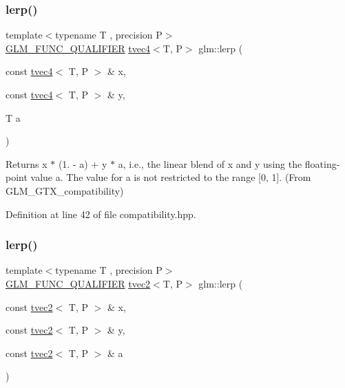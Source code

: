 \subsubsection{\texorpdfstring{lerp()}{lerp()}\hspace{0.1cm}{\footnotesize\ttfamily [4/7]}}
{\footnotesize\ttfamily template$<$typename T , precision P$>$ \\
\mbox{\hyperlink{setup_8hpp_a33fdea6f91c5f834105f7415e2a64407}{G\+L\+M\+\_\+\+F\+U\+N\+C\+\_\+\+Q\+U\+A\+L\+I\+F\+I\+ER}} \mbox{\hyperlink{structglm_1_1tvec4}{tvec4}}$<$T, P$>$ glm\+::lerp (\begin{DoxyParamCaption}\item[{const \mbox{\hyperlink{structglm_1_1tvec4}{tvec4}}$<$ T, P $>$ \&}]{x,  }\item[{const \mbox{\hyperlink{structglm_1_1tvec4}{tvec4}}$<$ T, P $>$ \&}]{y,  }\item[{T}]{a }\end{DoxyParamCaption})}



Returns x $\ast$ (1. -\/ a) + y $\ast$ a, i.\+e., the linear blend of x and y using the floating-\/point value a. The value for a is not restricted to the range \mbox{[}0, 1\mbox{]}. (From G\+L\+M\+\_\+\+G\+T\+X\+\_\+compatibility) 



Definition at line 42 of file compatibility.\+hpp.

\mbox{\label{group__gtx__compatibility_ga7609b44d8aefc5a277efe73395ff4070}} 
\subsubsection{\texorpdfstring{lerp()}{lerp()}\hspace{0.1cm}{\footnotesize\ttfamily [5/7]}}
{\footnotesize\ttfamily template$<$typename T , precision P$>$ \\
\mbox{\hyperlink{setup_8hpp_a33fdea6f91c5f834105f7415e2a64407}{G\+L\+M\+\_\+\+F\+U\+N\+C\+\_\+\+Q\+U\+A\+L\+I\+F\+I\+ER}} \mbox{\hyperlink{structglm_1_1tvec2}{tvec2}}$<$T, P$>$ glm\+::lerp (\begin{DoxyParamCaption}\item[{const \mbox{\hyperlink{structglm_1_1tvec2}{tvec2}}$<$ T, P $>$ \&}]{x,  }\item[{const \mbox{\hyperlink{structglm_1_1tvec2}{tvec2}}$<$ T, P $>$ \&}]{y,  }\item[{const \mbox{\hyperlink{structglm_1_1tvec2}{tvec2}}$<$ T, P $>$ \&}]{a }\end{DoxyParamCaption})}



